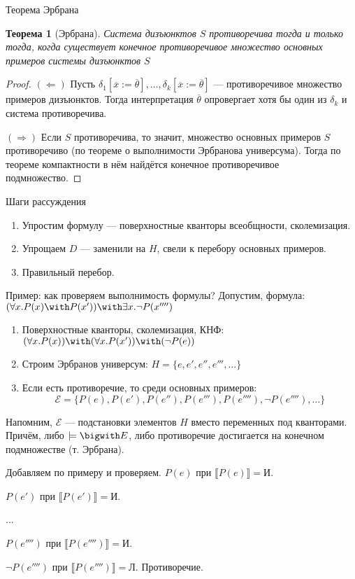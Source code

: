 \documentclass[aspectratio=169]{beamer}
\newtheorem{thm}{Теорема}[section]
\begin{document}
\begin{frame}{Теорема Эрбрана}
\begin{thm}[Эрбрана]Система дизъюнктов $S$ противоречива тогда и только тогда, когда существует
конечное противоречивое множество основных примеров системы дизъюнктов $S$\end{thm}
\begin{proof}$(\Leftarrow)$ 
Пусть $\delta_1[\overline{x} := \overline{\theta}],\dots,\delta_k[\overline{x} := \overline{\theta}]$ 
--- противоречивое множество примеров дизъюнктов. Тогда интерпретация $\overline{\theta}$
опровергает хотя бы один из $\delta_k$ и система противоречива.

$(\Rightarrow)$ Если $S$ противоречива, то значит, множество основных примеров $S$
противоречиво (по теореме о выполнимости Эрбранова универсума). Тогда по теореме компактности
в нём найдётся конечное противоречивое подмножество.
\end{proof}
\end{frame}

\begin{frame}{Шаги рассуждения}
\begin{enumerate}
\item \color{gray}Упростим формулу --- поверхностные кванторы всеобщности, сколемизация.
\item Упрощаем $D$ --- заменили на $H$, свели к перебору основных примеров.
\item \color{black}Правильный перебор.
\end{enumerate}
\end{frame}

\begin{frame}{Пример: как проверяем выполнимость формулы?}
Допустим, формула: $(\forall x.P(x)\with P(x')) \with \exists x.\neg P(x'''')$

\begin{enumerate}
\item Поверхностные кванторы, сколемизация, КНФ: $(\forall x.P(x)) \with (\forall x.P(x')) \with (\neg P(e))$
\item Строим Эрбранов универсум: $H = \{e, e', e'', e''', \dots \}$
\item Если есть противоречие, то среди основных примеров:
$$\mathcal{E} = \{ P(e), P(e'), P(e''), P(e'''), P(e''''), \neg P(e''''), \dots \}$$
\end{enumerate}

Напомним, $\mathcal{E}$ --- подстановки элементов $H$ вместо переменных под кванторами.
Причём, либо $\models\bigwith E$, либо противоречие достигается на конечном подмножестве (т. Эрбрана).

Добавляем по примеру и проверяем.
$P(e)$ при $\llbracket P(e) \rrbracket  = \text{И}$.

$P(e')$ при $\llbracket P(e') \rrbracket = \text{И}$.

...

$P(e'''')$ при $\llbracket P(e'''') \rrbracket = \text{И}$.

$\neg P(e'''')$ при $\llbracket P(e'''') \rrbracket = \text{Л}$. Противоречие.

\end{frame}
\end{document}
